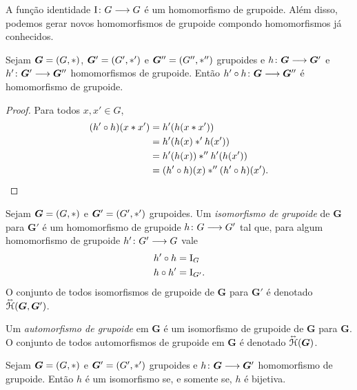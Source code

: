 A função identidade ${\mathrm{I}}\colon {G} \longrightarrow {G}$ é um homomorfismo de grupoide. Além disso, podemos gerar novos homomorfismos de grupoide compondo homomorfismos já conhecidos.

\begin{proposition}
\label{prop:composicao.morfismo.grupoide}
Sejam $\bm G=(G,\ast)$, $\bm G'=(G',\ast')$ e $\bm G''=(G'',\ast'')$ grupoides e ${h}\colon {\bm G } \longrightarrow {\bm G'}$ e ${h'}\colon {\bm G'} \longrightarrow {\bm G''}$ homomorfismos de grupoide. Então ${h' \circ h}\colon {\bm G} \longrightarrow {\bm G''}$ é homomorfismo de grupoide.
\end{proposition}
\begin{proof}
Para todos $x,x' \in G$,
	\begin{align*}
	(h' \circ h)(x \ast x') &= h'(h(x \ast x')) \\
		&= h'(h(x) \ast' h(x')) \\
		&= h'(h (x)) \ast'' h'(h(x')) \\
		&= (h' \circ h)(x) \ast'' (h' \circ h)(x').
		\qedhere
	\end{align*}
\end{proof}

\begin{definition}
Sejam $\bm G=(G,\ast)$ e $\bm G'=(G',\ast')$ grupoides. Um \emph{isomorfismo de grupoide} de $\bm G$ para $\bm G'$ é um homomorfismo de grupoide ${h}\colon {G} \longrightarrow {G'}$ tal que, para algum homomorfismo de grupoide ${h'}\colon {G'} \longrightarrow {G}$ vale
	\begin{align*}
	h' \circ h &= \mathrm{I}_{G} \\
	h \circ h' &= \mathrm{I}_{G'}.
	\end{align*}
O conjunto de todos isomorfismos de grupoide de $\bm G$ para $\bm G'$ é denotado $\accentset{\leftrightarrow}{\mathcal{H}}(\bm G,\bm G')$.

Um \emph{automorfismo de grupoide} em $\bm G$ é um isomorfismo de grupoide de $\bm G$ para $\bm G$. O conjunto de todos automorfismos de grupoide em $\bm G$ é denotado $\accentset{\leftrightarrow}{\mathcal{H}}(\bm G)$.
\end{definition}

\begin{exercise}
Sejam $\bm G=(G,\ast)$ e $\bm G'=(G',\ast')$ grupoides e ${h}\colon {\bm G } \longrightarrow {\bm G'}$ homomorfismo de grupoide. Então $h$ é um isomorfismo se, e somente se, $h$ é bijetiva.
\end{exercise}


